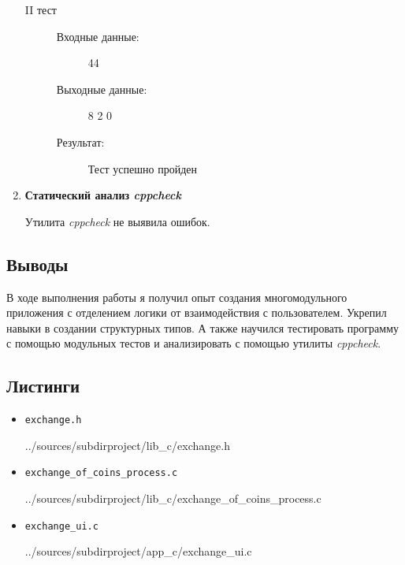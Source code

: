 \documentclass[12pt,a4paper]{report}
\begin{document}
\begin{enumerate}
\begin{description}
\item[II тест]
\hspace{\parindent}
\begin{flushleft}
\begin{description}
\item[Входные данные:] 44
\item[Выходные данные:] 8 2 0
\item[Результат:] Тест успешно пройден
\end{description}
\end{flushleft}
\end{description}

\item \textbf{Статический анализ \textit{cppcheck}}

Утилита \textit{cppcheck} не выявила ошибок.
\end{enumerate}
\subsection{Выводы}
\hspace{\parindent}
В ходе выполнения работы я получил опыт создания многомодульного приложения с отделением логики от взаимодействия с пользователем. Укрепил навыки в создании структурных типов. А также научился тестировать программу с помощью модульных тестов и анализировать с помощью утилиты \textit{cppcheck}.
\subsection*{Листинги}
\begin{itemize}
\item[] \verb-exchange.h-

{../sources/subdirproject/lib_c/exchange.h}
\item[] \verb-exchange_of_coins_process.c-

{../sources/subdirproject/lib_c/exchange_of_coins_process.c}
\item[] \verb-exchange_ui.c-

{../sources/subdirproject/app_c/exchange_ui.c}
\end{itemize}

%
\end{document}
